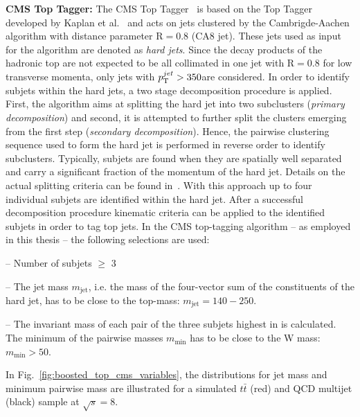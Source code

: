 \begin{description}
 \item \textbf{CMS Top Tagger:} The CMS Top Tagger~\cite{CMS-PAS-JME-09-001} is based on the Top Tagger developed by Kaplan et al.~\cite{Kaplan:2008ie} and acts on jets clustered by the Cambrigde-Aachen algorithm with distance parameter $\mathrm{R} = 0.8$ (CA8 jet). These jets used as input for the algorithm are denoted as \textit{hard jets}. Since the decay products of the hadronic top are not expected to be all collimated in one jet with $\mathrm{R} = 0.8$ for low transverse momenta, only jets with $p_{\text{T}}^{jet} > 350$\gev are considered. In order to identify subjets within the hard jets, a two stage decomposition procedure is applied. First, the algorithm aims at splitting the hard jet into two subclusters (\textit{primary decomposition}) and second, it is attempted to further split the clusters emerging from the first step (\textit{secondary decomposition}). Hence, the pairwise clustering sequence used to form the hard jet is performed in reverse order to identify subclusters. Typically, subjets are found when they are spatially well separated and carry a significant fraction of the momentum of the hard jet. Details on the actual splitting criteria can be found in~\cite{CMS:2014fya}. With this approach up to four individual subjets are identified within the hard jet. After a successful decomposition procedure kinematic criteria can be applied to the identified subjets in order to tag top jets. In the CMS top-tagging algorithm -- as employed in this thesis -- the following selections are used:
\begin{description}
 \item -- Number of subjets $\ge$ 3
 \item -- The jet mass $m_{\mathrm{jet}}$, i.e. the mass of the four-vector sum of the constituents of the hard jet, has to be close to the top-mass: $m_{\mathrm{jet}} = 140-250$\gev.
 \item -- The invariant mass of each pair of the three subjets highest in \pt is calculated. The minimum of the pairwise masses $m_{\mathrm{min}}$ has to be close to the W mass: $m_{\mathrm{min}} > 50$\gev.
\end{description}
In Fig.~\ref{fig:boosted_top_cms_variables}, the distributions for jet mass and minimum pairwise mass are illustrated for a simulated $t\bar{t}$ (red) and QCD multijet (black) sample at $\sqrt{s} = 8$\tev. 

\end{description}

